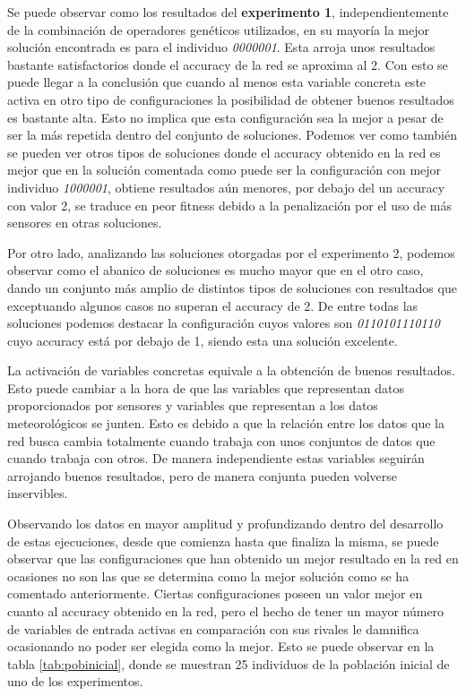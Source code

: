 Se puede observar como los resultados del \textbf{experimento 1}, independientemente de la combinación de operadores genéticos utilizados, en su mayoría la mejor solución encontrada es para el individuo \textit{0000001}. Esta arroja unos resultados bastante satisfactorios donde el accuracy de la red se aproxima al 2. Con esto se puede llegar a la conclusión que cuando al menos esta variable concreta este activa en otro tipo de configuraciones la posibilidad de obtener buenos resultados es bastante alta. Esto no implica que esta configuración sea la mejor a pesar de ser la más repetida dentro del conjunto de soluciones. Podemos ver como también se pueden ver otros tipos de soluciones donde el accuracy obtenido en la red es mejor que en la solución comentada como puede ser la configuración con mejor individuo \textit{1000001}, obtiene resultados aún menores, por debajo del un accuracy con valor 2, se traduce en peor fitness debido a la penalización por el uso de más sensores en otras soluciones.

Por otro lado, analizando las soluciones otorgadas por el experimento 2, podemos observar como el abanico de soluciones es mucho mayor que en el otro caso, dando un conjunto más amplio de distintos tipos de soluciones con resultados que exceptuando algunos casos no superan el accuracy de 2. De entre todas las soluciones podemos destacar la configuración cuyos valores son \textit{0110101110110} cuyo accuracy está por debajo de 1, siendo esta una solución excelente.

La activación de variables concretas equivale a la obtención de buenos resultados. Esto puede cambiar a la hora de que las variables que representan datos proporcionados por sensores y variables que representan a los datos meteorológicos se junten. Esto es debido a que la relación entre los datos que la red busca cambia totalmente cuando trabaja con unos conjuntos de datos que cuando trabaja con otros. De manera independiente estas variables seguirán arrojando buenos resultados, pero de manera conjunta pueden volverse inservibles.

Observando los datos en mayor amplitud y profundizando dentro del desarrollo de estas ejecuciones, desde que comienza hasta que finaliza la misma, se puede observar que las configuraciones que han obtenido un mejor resultado en la red en ocasiones no son las que se determina como la mejor solución como se ha comentado anteriormente. Ciertas configuraciones poseen un valor mejor en cuanto al accuracy obtenido en la red, pero el hecho de tener un mayor número de variables de entrada activas en comparación con sus rivales le damnifica ocasionando no poder ser elegida como la mejor. Esto se puede observar en la tabla \ref{tab:pobinicial}, donde se muestran 25 individuos de la población inicial de uno de los experimentos.


